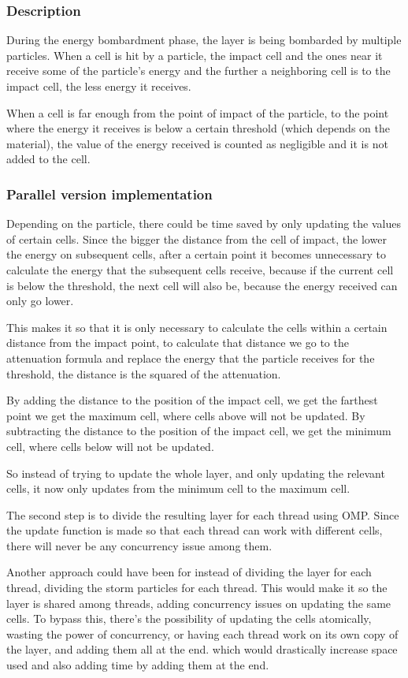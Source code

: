 \subsubsection{Description}

During the energy bombardment phase, the layer is being bombarded by multiple particles. When a cell is hit by a particle, the impact cell and the ones near it receive some of the particle's energy and the further a neighboring cell is to the impact cell, the less energy it receives.

When a cell is far enough from the point of impact of the particle, to the point where the energy it receives is below a certain threshold (which depends on the material), the value of the energy received is counted as negligible and it is not added to the cell.

\subsubsection{Parallel version implementation}

Depending on the particle, there could be time saved by only updating the values of certain cells. Since the bigger the distance from the cell of impact, the lower the energy on subsequent cells, after a certain point it becomes unnecessary to calculate the energy that the subsequent cells receive, because if the current cell is below the threshold, the next cell will also be, because the energy received can only go lower.

This makes it so that it is only necessary to calculate the cells within a certain distance from the impact point, to calculate that distance we go to the attenuation formula and replace the energy that the particle receives for the threshold, the distance is the squared of the attenuation.

By adding the distance to the position of the impact cell, we get the farthest point we get the maximum cell, where cells above will not be updated. By subtracting the distance to the position of the impact cell, we get the minimum cell, where cells below will not be updated.

So instead of trying to update the whole layer, and only updating the relevant cells, it now only updates from the minimum cell to the maximum cell.

The second step is to divide the resulting layer for each thread using OMP. Since the update function is made so that each thread can work with different cells, there will never be any concurrency issue among them.

Another approach could have been for instead of dividing the layer for each thread, dividing the storm particles for each thread. This would make it so the layer is shared among threads, adding concurrency issues on updating the same cells. To bypass this, there's the possibility of updating the cells atomically, wasting the power of concurrency, or having each thread work on its own copy of the layer, and adding them all at the end. which would drastically increase space used and also adding time by adding them at the end.



